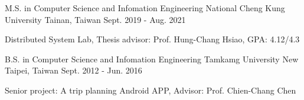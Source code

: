 

\begin{cventries}

  \cventry
    {M.S. in Computer Science and Infomation Engineering} %
    {National Cheng Kung University} %
    {Tainan, Taiwan} %
    {Sept. 2019 - Aug. 2021} %
    {
      \begin{cvitems} %
        \item {Distributed System Lab, Thesis advisor: Prof. Hung-Chang Hsiao, GPA: 4.12/4.3}
      \end{cvitems}
    }

  \cventry
    {B.S. in Computer Science and Infomation Engineering} %
    {Tamkamg University} %
    {New Taipei, Taiwan} %
    {Sept. 2012 - Jun. 2016} %
    {
      \begin{cvitems} %
        \item {Senior project: A trip planning Android APP, Advisor: Prof. Chien-Chang Chen}
      \end{cvitems}
    }

\end{cventries}
